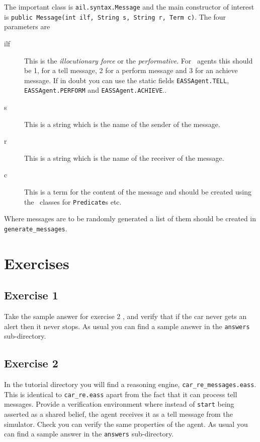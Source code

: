 The important class is \texttt{ail.syntax.Message} and the main constructor of interest is \texttt{public Message(int ilf, String s, String r, Term c)}.  The four parameters are
\begin{description}
\item[ilf] This is the \emph{illocutionary force} or the \emph{performative}.  For \eass\ agents this should be 1, for a tell message, 2 for a perform message and 3 for an achieve message.  If in doubt you can use the static fields \texttt{EASSAgent.TELL}, \texttt{EASSAgent.PERFORM} and \texttt{EASSAgent.ACHIEVE}..
\item[s] This is a string which is the name of the sender of the message.
\item[r] This is a string which is the name of the receiver of the message.
\item[c] This is a term for the content of the message and should be created using the \ail\ classes for \texttt{Predicate}s etc.
\end{description}

Where messages are to be randomly generated a list of them should be created in \texttt{generate\_messages}.

\section{Exercises}

\subsection{Exercise 1}
Take the sample answer for exercise 2 , and verify that if the car never gets an alert then it never stops.  As usual you can find a sample answer in the \texttt{answers} sub-directory.

\subsection{Exercise 2}
In the tutorial directory you will find a reasoning engine, \texttt{car\_re\_messages.eass}.  This is identical to \texttt{car\_re.eass} apart from the fact that it can process tell messages.  Provide a verification environment where instead of \lstinline{start} being asserted as a shared belief, the agent receives it as a tell message from the simulator.  Check you can verify the same properties of the agent.  As usual you can find a sample answer in the \texttt{answers} sub-directory.



